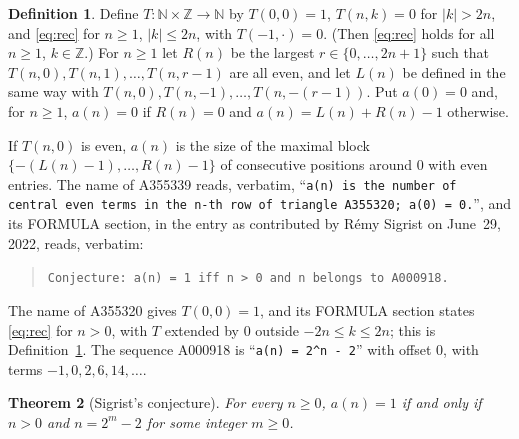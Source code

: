 \documentclass[11pt]{amsart}
\theoremstyle{plain}
\newtheorem{theorem}{Theorem}
\theoremstyle{definition}
\newtheorem{definition}[theorem]{Definition}
\newcommand{\N}{\mathbb{N}}
\newcommand{\Z}{\mathbb{Z}}
\begin{document}
\begin{definition}\label{def:T}
Define $T\colon\N\times\Z\to\N$ by $T(0,0)=1$, $T(n,k)=0$ for $|k|>2n$, and \eqref{eq:rec} for $n\ge1$, $|k|\le2n$, with $T(-1,\cdot)=0$. (Then \eqref{eq:rec} holds for all $n\ge1$, $k\in\Z$.)
For $n\ge1$ let $R(n)$ be the largest $r\in\{0,\dots,2n+1\}$ such that $T(n,0),T(n,1),\dots,T(n,r-1)$ are all even, and let $L(n)$ be defined in the same way with $T(n,0),T(n,-1),\dots,T(n,-(r-1))$. Put $a(0)=0$ and, for $n\ge1$, $a(n)=0$ if $R(n)=0$ and $a(n)=L(n)+R(n)-1$ otherwise.
\end{definition}

If $T(n,0)$ is even, $a(n)$ is the size of the maximal block $\{-(L(n)-1),\dots,R(n)-1\}$ of consecutive positions around $0$ with even entries.
The name of A355339 \cite{A355339} reads, verbatim, ``\texttt{a(n) is the number of central even terms in the n-th row of triangle A355320; a(0) = 0.}'', and its FORMULA section, in the entry as contributed by R\'emy Sigrist on June~29, 2022, reads, verbatim:
\begin{quote}
{\small\texttt{Conjecture: a(n) = 1 iff n > 0 and n belongs to A000918.}}
\end{quote}
The name of A355320 \cite{A355320} gives $T(0,0)=1$, and its FORMULA section states \eqref{eq:rec} for $n>0$, with $T$ extended by $0$ outside $-2n\le k\le 2n$; this is Definition~\ref{def:T}. The sequence A000918 \cite{A000918} is ``\texttt{a(n) = 2\^{}n - 2}'' with offset $0$, with terms $-1,0,2,6,14,\dots$.

\begin{theorem}[Sigrist's conjecture]\label{thm:main}
For every $n\ge0$, $a(n)=1$ if and only if $n>0$ and $n=2^m-2$ for some integer $m\ge0$.
\end{theorem}
\end{document}
